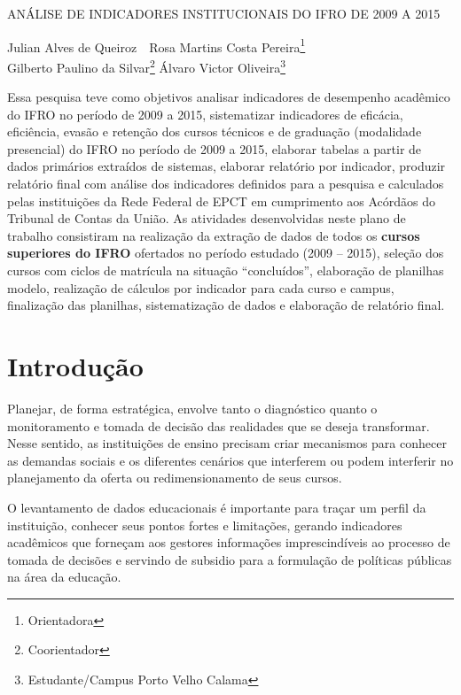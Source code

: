 \documentclass[article,12pt,onesidea,4paper,english,brazil]{abntex2}
\begin{document}
	
	
	\frenchspacing 
	
	\begin{center}
		\LARGE \MakeUppercase{Análise de indicadores institucionais do IFRO de 2009 a 2015}
		
		\normalsize
		Julian Alves de Queiroz \,\, 
		Rosa Martins Costa Pereira\footnote{Orientadora} \\
		Gilberto Paulino da Silvar\footnote{Coorientador} 
		Álvaro Victor Oliveira\footnote{Estudante/Campus Porto Velho Calama} 
	\end{center}
	
	\begin{resumoumacoluna}
		Essa pesquisa teve como objetivos analisar indicadores de desempenho acadêmico do IFRO
		no período de 2009 a 2015, sistematizar indicadores de eficácia, eficiência, evasão e retenção dos
		cursos técnicos e de graduação (modalidade presencial) do IFRO no período de 2009 a 2015,
		elaborar tabelas a partir de dados primários extraídos de sistemas,
		elaborar relatório por indicador, produzir relatório final com análise dos indicadores definidos
		para a pesquisa e calculados pelas instituições da Rede Federal de EPCT em cumprimento aos
		Acórdãos do Tribunal de Contas da União. As atividades desenvolvidas neste plano de trabalho
		consistiram na realização da extração de dados de todos os \textbf{cursos superiores do IFRO} ofertados
		no período estudado (2009 – 2015), seleção dos cursos com ciclos de matrícula na situação
		“concluídos”, elaboração de planilhas modelo, realização de cálculos por indicador para cada
		curso e campus, finalização das planilhas, sistematização de dados e elaboração de relatório final.
	\end{resumoumacoluna}
	
	\section*{Introdução}
	
	Planejar, de forma estratégica, envolve tanto o diagnóstico quanto o monitoramento e
	tomada de decisão das realidades que se deseja transformar. Nesse sentido, as instituições de
	ensino precisam criar mecanismos para conhecer as demandas sociais e os diferentes cenários que
	interferem ou podem interferir no planejamento da oferta ou redimensionamento de seus cursos.
	
	O levantamento de dados educacionais é importante para traçar um perfil da instituição,
	conhecer seus pontos fortes e limitações, gerando indicadores acadêmicos que forneçam aos
	gestores informações imprescindíveis ao processo de tomada de decisões e servindo de subsidio
	para a formulação de políticas públicas na área da educação.
	
\end{document}
